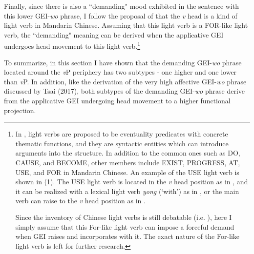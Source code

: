 \documentclass[output=paper,colorlinks,citecolor=brown]{langscibook}
\begin{document}
Finally, since there is also a “demanding" mood exhibited in the sentence with this lower GEI-\textit{wo} phrase, I follow the proposal of \citet{Lin2001} that the \textit{v} head is a kind of light verb in Mandarin Chinese. Assuming that this light verb is a FOR-like light verb, the “demanding" meaning can be derived when the applicative GEI undergoes head movement to this light verb.\footnote{In \citet{Lin2001}, light verbs are proposed to be eventuality predicates with concrete thematic functions, and they are syntactic entities which can introduce arguments into the structure. In addition to the common ones such as DO, CAUSE, and BECOME, other members include EXIST, PROGRESS, AT, USE, and FOR in Mandarin Chinese. An example of the USE light verb is shown in (\ref{kuos}). The USE light verb is located in the \textit{v} head position as in , and it can be realized with a lexical light verb \textit{yong} (`with') as in , or the main verb can raise to the \textit{v} head position as in .
\ea
\label{kuos}
    \z
\z

Since the inventory of Chinese light verbs is still debatable (i.e. \citealt{Tsai2012}), here I simply assume that this For-like light verb can impose a forceful demand when GEI raises and incorporates with it. The exact nature of the For-like light verb is left for further research.}\par
To summarize, in this section I have shown that the demanding GEI-\textit{wo} phrase located around the \textit{v}P periphery has two subtypes - one higher and one lower than \textit{v}P. In addition, like the derivation of the very high affective GEI-\textit{wo} phrase discussed by Tsai (2017), both subtypes of the demanding GEI-\textit{wo} phrase derive from the applicative GEI undergoing head movement to a higher functional projection. 
\end{document}
